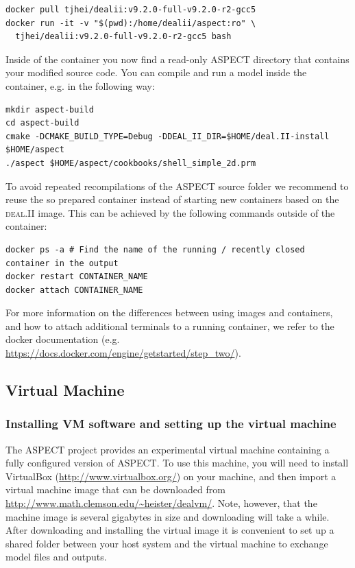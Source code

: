 \documentclass{article}
\newcommand{\dealii}{{\textsc{deal.II}}}
\newcommand{\aspect}{\textsc{ASPECT}}
\begin{document}
\begin{lstlisting}[frame=single,language=ksh,showstringspaces=false]
docker pull tjhei/dealii:v9.2.0-full-v9.2.0-r2-gcc5
docker run -it -v "$(pwd):/home/dealii/aspect:ro" \
  tjhei/dealii:v9.2.0-full-v9.2.0-r2-gcc5 bash
\end{lstlisting}

Inside of the container you now find a read-only \aspect{} directory that
contains your modified source code. You can compile and run a model inside the
container, e.g. in the following way:

\begin{lstlisting}[frame=single,language=ksh]
mkdir aspect-build
cd aspect-build
cmake -DCMAKE_BUILD_TYPE=Debug -DDEAL_II_DIR=$HOME/deal.II-install $HOME/aspect
./aspect $HOME/aspect/cookbooks/shell_simple_2d.prm
\end{lstlisting}

To avoid repeated recompilations of the \aspect{} source folder we recommend to
reuse the so prepared container instead of starting new containers based on the
\dealii{} image. This can be achieved by the following commands outside of the
container:

\begin{lstlisting}[frame=single,language=ksh]
docker ps -a # Find the name of the running / recently closed container in the output
docker restart CONTAINER_NAME
docker attach CONTAINER_NAME
\end{lstlisting}

For more information on the differences between using images and containers,
and how to attach additional terminals to a running container, we refer to the
docker documentation (e.g.
\url{https://docs.docker.com/engine/getstarted/step_two/}).

\subsection{Virtual Machine}

\subsubsection{Installing VM software and setting up the virtual machine}

The \aspect{} project provides an experimental virtual machine containing a
fully configured version of \aspect{}. To use this machine, you will need to
install VirtualBox (\url{http://www.virtualbox.org/}) on your machine, and then
import a virtual machine image that can be downloaded from
\url{http://www.math.clemson.edu/~heister/dealvm/}. Note, however, that the
machine image is several gigabytes in size and downloading will take a while.
After downloading and installing the virtual image it is convenient to set up a
shared folder between your host system and the virtual machine to exchange model
files and outputs.
\end{document}
